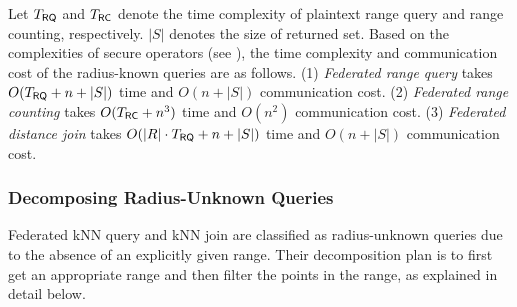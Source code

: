 Let $T_{\textsf{RQ}}$ and $T_{\textsf{RC}}$ denote the time complexity of plaintext range query and range counting, respectively. 
$|S|$ denotes the size of returned set.
Based on the complexities of secure operators (see ), the time complexity and communication cost of the radius-known queries are as follows.
(1) \textit{Federated range query} takes $O(T_{\textsf{RQ}}+n+|S|)$ time and $O(n+|S|)$ communication cost.
(2) \textit{Federated range counting} takes $O(T_{\textsf{RC}}+n^3)$ time and $O(n^2)$ communication cost.
(3) \textit{Federated distance join} takes $O(|R| \cdot T_{\textsf{RQ}}+n+|S|)$ time and $O(n+|S|)$ communication cost.

\subsubsection{Decomposing Radius-Unknown Queries}
\label{sec:asymmetric-urad}
Federated kNN query and kNN join are classified as radius-unknown queries due to the absence of an explicitly given range.
Their decomposition plan is to first get an appropriate range and then filter the points in the range, as explained in detail below.

